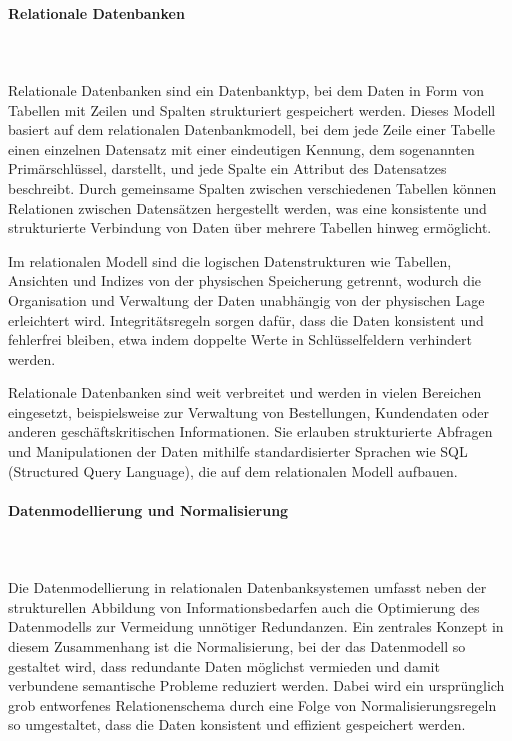 \paragraph{Relationale Datenbanken}
\mbox{}\\
\mbox{}\\
Relationale Datenbanken sind ein Datenbanktyp, bei dem Daten in Form von Tabellen mit Zeilen und Spalten strukturiert gespeichert werden. Dieses Modell basiert auf dem relationalen Datenbankmodell, bei dem jede Zeile einer Tabelle einen einzelnen Datensatz mit einer eindeutigen Kennung, dem sogenannten Primärschlüssel, darstellt, und jede Spalte ein Attribut des Datensatzes beschreibt. Durch gemeinsame Spalten zwischen verschiedenen Tabellen können Relationen zwischen Datensätzen hergestellt werden, was eine konsistente und strukturierte Verbindung von Daten über mehrere Tabellen hinweg ermöglicht.\cite{oracle_relational_database}

Im relationalen Modell sind die logischen Datenstrukturen wie Tabellen, Ansichten und Indizes von der physischen Speicherung getrennt, wodurch die Organisation und Verwaltung der Daten unabhängig von der physischen Lage erleichtert wird. Integritätsregeln sorgen dafür, dass die Daten konsistent und fehlerfrei bleiben, etwa indem doppelte Werte in Schlüsselfeldern verhindert werden.

Relationale Datenbanken sind weit verbreitet und werden in vielen Bereichen eingesetzt, beispielsweise zur Verwaltung von Bestellungen, Kundendaten oder anderen geschäftskritischen Informationen. Sie erlauben strukturierte Abfragen und Manipulationen der Daten mithilfe standardisierter Sprachen wie SQL (Structured Query Language), die auf dem relationalen Modell aufbauen.

\paragraph{Datenmodellierung und Normalisierung}
\mbox{}\\
\mbox{}\\
Die Datenmodellierung in relationalen Datenbanksystemen umfasst neben der strukturellen Abbildung von Informationsbedarfen auch die Optimierung des Datenmodells zur Vermeidung unnötiger Redundanzen. Ein zentrales Konzept in diesem Zusammenhang ist die Normalisierung, bei der das Datenmodell so gestaltet wird, dass redundante Daten möglichst vermieden und damit verbundene semantische Probleme reduziert werden. Dabei wird ein ursprünglich grob entworfenes Relationenschema durch eine Folge von Normalisierungsregeln so umgestaltet, dass die Daten konsistent und effizient gespeichert werden.\cite{dbengines_normalisierung}

